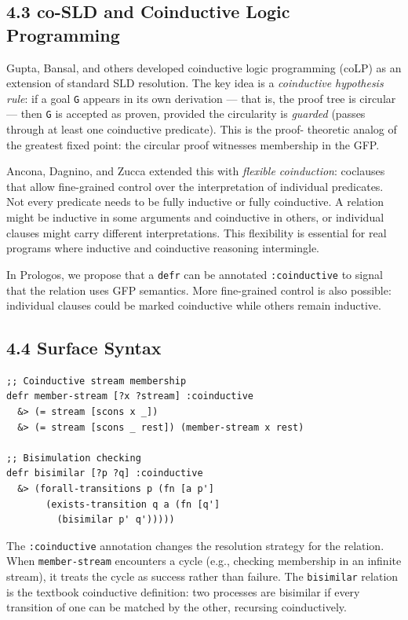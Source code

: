 \documentclass[11pt]{article}
\begin{document}
\subsection{4.3 co-SLD and Coinductive Logic Programming}
\label{sec:orgffe11d2}

Gupta, Bansal, and others developed coinductive logic programming
(coLP) as an extension of standard SLD resolution. The key idea is a
\emph{coinductive hypothesis rule}: if a goal \texttt{G} appears in its own
derivation --- that is, the proof tree is circular --- then \texttt{G} is
accepted as proven, provided the circularity is \emph{guarded} (passes
through at least one coinductive predicate). This is the proof-
theoretic analog of the greatest fixed point: the circular proof
witnesses membership in the GFP.

Ancona, Dagnino, and Zucca extended this with \emph{flexible coinduction}:
coclauses that allow fine-grained control over the interpretation of
individual predicates. Not every predicate needs to be fully inductive
or fully coinductive. A relation might be inductive in some arguments
and coinductive in others, or individual clauses might carry different
interpretations. This flexibility is essential for real programs where
inductive and coinductive reasoning intermingle.

In Prologos, we propose that a \texttt{defr} can be annotated \texttt{:coinductive}
to signal that the relation uses GFP semantics. More fine-grained
control is also possible: individual clauses could be marked
coinductive while others remain inductive.
\subsection{4.4 Surface Syntax}
\label{sec:org78a7d51}

\begin{verbatim}
;; Coinductive stream membership
defr member-stream [?x ?stream] :coinductive
  &> (= stream [scons x _])
  &> (= stream [scons _ rest]) (member-stream x rest)

;; Bisimulation checking
defr bisimilar [?p ?q] :coinductive
  &> (forall-transitions p (fn [a p']
       (exists-transition q a (fn [q']
         (bisimilar p' q')))))
\end{verbatim}

The \texttt{:coinductive} annotation changes the resolution strategy for the
relation. When \texttt{member-stream} encounters a cycle (e.g., checking
membership in an infinite stream), it treats the cycle as success
rather than failure. The \texttt{bisimilar} relation is the textbook
coinductive definition: two processes are bisimilar if every
transition of one can be matched by the other, recursing coinductively.
\end{document}
